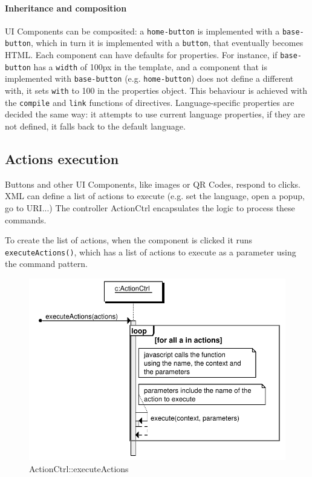 \paragraph{Inheritance and composition} UI Components can be composited: a \texttt{home-button} is implemented with a \texttt{base-button}, which in turn it is implemented with a \texttt{button}, that eventually becomes \ac{HTML}.
Each component can have defaults for properties.
For instance, if \texttt{base-button} has a \texttt{width} of 100px in the template, and a component that is implemented with \texttt{base-button} (e.g. \texttt{home-button}) does not define a different with, it sets \texttt{with} to 100 in the properties object.
This behaviour is achieved with the \texttt{compile} and \texttt{link} functions of directives.
Language-specific properties are decided the same way: it attempts to use current language properties, if they are not defined, it falls back to the default language.

\subsection{Actions execution}
Buttons and other UI Components, like images or QR Codes, respond to clicks.
\ac{XML} can define a list of actions to execute (e.g. set the language, open a popup, go to \ac{URI}...)
The controller ActionCtrl encapsulates the logic to process these commands.





To create the list of actions, when the component is clicked it runs \lstinline$executeActions()$, which has a list of actions to execute as a parameter using the command pattern.

\begin{figure}[htb]
    \centering
    \includegraphics{figures/design/seqdia/actionCtrl-executeActions.pdf}
    \caption{ActionCtrl::executeActions}
    \label{fig:design-seqdia-actionCtrl-executeActions}
\end{figure}

